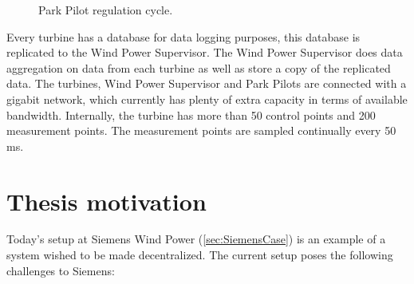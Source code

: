 \begin{figure}[!h]
	\centering
	
	\caption[The current Siemens wind farm system overview]{
		\label{fig:currentSiemensCycleTime} 
		\footnotesize{%
			Park Pilot regulation cycle.
		}
	}
\end{figure}

Every turbine has a database for data logging purposes, this database is replicated to the Wind Power Supervisor.
The Wind Power Supervisor does data aggregation on data from each turbine as well as store a copy of the replicated data.
The turbines, Wind Power Supervisor and Park Pilots are connected with a gigabit network, which currently has plenty of extra capacity in terms of available bandwidth.
Internally, the turbine has more than 50 control points and 200 measurement points. The measurement points are sampled continually every 50 ms.

%	
%		
%	
%					
%

\section{Thesis motivation}
\label{sec:ThesisMotivation}
Today's setup at Siemens Wind Power (\cref{sec:SiemensCase}) is an example of a system wished to be made decentralized. The current setup poses the following challenges to Siemens:  

